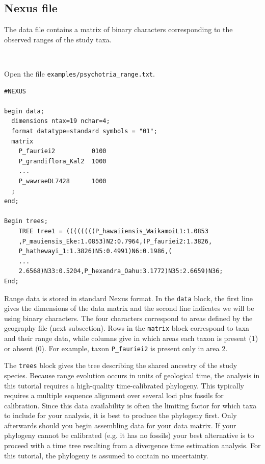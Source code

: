 \documentclass[11pt]{article}
\newcommand{\impmark}{\strut\vadjust{\domark}}
\newcommand{\domark}{%
  \vbox to 0pt{
    \kern-\dp\strutbox
    \smash{\llap{$\rightarrow$\kern1em}}
    \vss
  }%
}
\begin{document}
\subsection{Nexus file}

The data file contains a matrix of binary characters corresponding to the observed ranges of the study taxa.

\noindent \\ \impmark  Open the file \texttt{examples/psychotria\_range.txt}.

\begin{framed}
\begin{lstlisting}
#NEXUS

begin data;
  dimensions ntax=19 nchar=4;
  format datatype=standard symbols = "01";
  matrix
    P_fauriei2          0100
    P_grandiflora_Kal2  1000
    ...
    P_wawraeDL7428      1000	
  ;
end;

Begin trees;
	TREE tree1 = ((((((((P_hawaiiensis_WaikamoiL1:1.0853
	,P_mauiensis_Eke:1.0853)N2:0.7964,(P_fauriei2:1.3826,
	P_hathewayi_1:1.3826)N5:0.4991)N6:0.1986,(
	...
	2.6568)N33:0.5204,P_hexandra_Oahu:3.1772)N35:2.6659)N36;
End;
\end{lstlisting}
\end{framed}

Range data is stored in standard Nexus format.
In the {\tt data} block, the first line gives the dimensions of the data matrix and the second line indicates we will be using binary characters.
The four characters correspond to areas defined by the geography file (next subsection).
Rows in the {\tt matrix} block correspond to taxa and their range data, while columns give in which areas each taxon is present (1) or absent (0).
For example, taxon {\tt P\_fauriei2} is present only in area 2.

The {\tt trees} block gives the tree describing the shared ancestry of the study species.
Because range evolution occurs in units of geological time, the analysis in this tutorial requires a high-quality time-calibrated phylogeny.
This typically requires a multiple sequence alignment over several loci plus fossils for calibration.
Since this data availability is often the limiting factor for which taxa to include for your analysis, it is best to produce the phylogeny first.
Only afterwards should you begin assembling data for your data matrix.
If your phylogeny cannot be calibrated (e.g. it has no fossils) your best alternative is to proceed with a time tree resulting from a divergence time estimation analysis.
For this tutorial, the phylogeny is assumed to contain no uncertainty.
\end{document}
